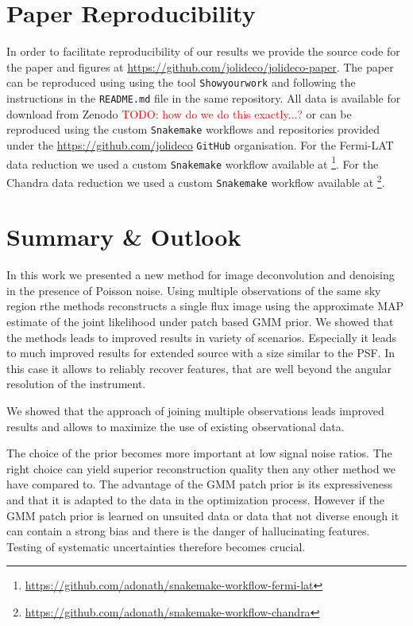 \documentclass[twocolumn]{aastex631}
\newcommand{\todo}[1]{\textcolor{red}{TODO: #1}\PackageWarning{TODO:}{#1!}}
\begin{document}
    \section{Paper Reproducibility}
    \label{sec:reproducibility}
    In order to facilitate reproducibility of our results we provide the source code for the paper and figures at \url{https://github.com/jolideco/jolideco-paper}. The paper can be reproduced using using the tool \texttt{Showyourwork} \citep{Luger2021} and following the instructions in the \texttt{README.md} file in the same repository. All data is available for download from Zenodo \todo{how do we do this exactly...?} or can be reproduced using the custom  \texttt{Snakemake} workflows and repositories provided under the \url{https://github.com/jolideco} \texttt{GitHub} organisation. For the Fermi-LAT data reduction we used a custom \texttt{Snakemake} workflow  available at \footnote{\url{https://github.com/adonath/snakemake-workflow-fermi-lat}}. For the Chandra data reduction we used a custom \texttt{Snakemake} workflow available at \footnote{\url{https://github.com/adonath/snakemake-workflow-chandra}}.
        
    
    \section{Summary \& Outlook}
    In this work we presented a new method for image deconvolution and denoising in the presence of Poisson noise. Using multiple observations of the same sky region rthe methods reconstructs a single flux image using the approximate MAP estimate of the joint likelihood under patch based GMM prior. We showed that the methods leads to improved results in variety of scenarios. Especially it leads to much improved results for extended source with a size similar to the PSF. In this case it allows to reliably recover features, that are well beyond the angular resolution of the instrument.

    We showed that the approach of joining multiple observations leads improved results and allows to maximize the use of existing observational data.

    The choice of the prior becomes more important at low signal noise ratios. The right choice can yield superior reconstruction quality then any other method we have compared to. The advantage of the GMM patch prior is its expressiveness and that it is adapted to the data in the optimization process. However if the GMM patch prior is learned on unsuited data or data that not diverse enough it can contain a strong bias and there is the danger of hallucinating features. Testing of systematic uncertainties therefore becomes crucial.
\end{document}
